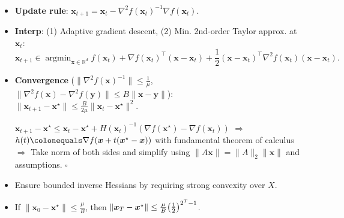 \documentclass[8pt,a4paper]{extarticle}
\renewcommand{\proof}[1]{\begin{tcolorbox}#1 \hfill $\square$\end{tcolorbox}}
\DeclareMathOperator*{\argmin}{argmin}
\newcommand{\lft}{\mathopen{}\mathclose\bgroup\left}
\newcommand{\rgt}{\aftergroup\egroup\right}
\newcommand{\R}{\mathbb{R}}
\renewcommand{\vec}[1]{\bm{#1}}
\newcommand{\mat}[1]{#1}
\newenvironment{topic}[1]
{\textbf{\sffamily \colorbox{black}{\rlap{\textbf{\textcolor{white}{#1}}}\hspace{\linewidth}\hspace{-2\fboxsep}}} \\ \vspace{0.2cm}}
{}
\begin{document}
\begin{multicols*}{2}
    \begin{topic}{Newton's method}
        \begin{itemize}
            \item \textbf{Update rule}: $\vec{x}_{t+1} = \vec{x}_t - \nabla^2 f(\vec{x}_t)^{-1} \nabla f(\vec{x}_t)$.
            \item \textbf{Interp}: (1) Adaptive gradient descent, (2) Min. 2nd-order Taylor approx. at $\vec{x}_t$: \[
                      \vec{x}_{t+1} \in \argmin_{\vec{x} \in \R^d} f(\vec{x}_t) + \nabla f(\vec{x}_t)^\top (\vec{x} - \vec{x}_t) + \frac{1}{2} (\vec{x} - \vec{x}_t)^\top \nabla^2 f(\vec{x}_t) (\vec{x} - \vec{x}_t).
                  \]
            \item \textbf{Convergence} ($\| \nabla^2 f(\vec{x})^{-1} \| \leq \frac{1}{\mu}$, $\| \nabla^2 f(\vec{x}) - \nabla^2 f(\vec{y}) \| \leq B \| \vec{x} - \vec{y} \|$): \\
                  $\| \vec{x}_{t+1} - \vec{x}^\star \| \leq \frac{B}{2 \mu} \| \vec{x}_t - \vec{x}^\star \|^2$.
                  \proof{$\vec{x}_{t+1} - \vec{x}^\star \leq \vec{x}_t - \vec{x}^\star +
                          H(\vec{x}_t)^{-1} (\nabla f(\vec{x}^\star) - \nabla f(\vec{x}_t))$ $\Rightarrow$
                      $h(t) \colonequals \nabla f(\vec{x} + t(\vec{x}^\star - \vec{x}))$ with fundamental theorem
                      of calculus $\Rightarrow$ Take norm of both sides and simplify using $\| \mat{A}
                          \vec{x} \| = \| \mat{A} \|_2 \| \vec{x} \|$ and assumptions.}
            \item Ensure bounded inverse Hessians by requiring strong convexity over $X$.
            \item If $\| \vec{x}_0 - \vec{x}^\star \| \leq \frac{\mu}{B}$, then $\| \vec{x}_T - \vec{x}^\star \| \leq
                      \frac{\mu}{B} \lft( \frac{1}{2} \rgt)^{2^T - 1}$.

        \end{itemize}
    \end{topic}


\end{multicols*}
\end{document}
